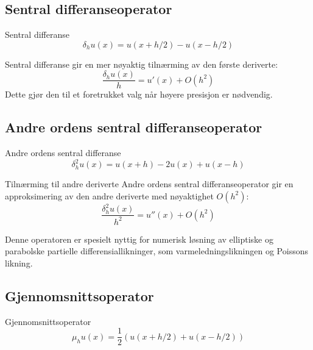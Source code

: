 \subsection{Sentral differanseoperator}
\begin{definition}{Sentral differanse}{}
	\begin{equation}
		\delta_h u(x) = u(x + h/2) - u(x - h/2) \label{eq:central_diff}
	\end{equation}
\end{definition}

\begin{remark*}{}{}
	Sentral differanse gir en mer nøyaktig tilnærming av den første deriverte:
	\begin{equation}
		\frac{\delta_h u(x)}{h} = u'(x) + O(h^2)
	\end{equation}
	Dette gjør den til et foretrukket valg når høyere presisjon er nødvendig.
\end{remark*}

\subsection{Andre ordens sentral differanseoperator}
\begin{definition}{Andre ordens sentral differanse}{}
	\begin{equation}
		\delta_h^2 u(x) = u(x + h) - 2u(x) + u(x - h) \label{eq:second_central_diff}
	\end{equation}
\end{definition}

\begin{proposition}{Tilnærming til andre deriverte}{}
	Andre ordens sentral differanseoperator gir en approksimering av den andre deriverte med nøyaktighet $O(h^2)$:
	\begin{equation}
		\frac{\delta_h^2 u(x)}{h^2} = u''(x) + O(h^2)
	\end{equation}
\end{proposition}

\begin{remark*}{}{}
	Denne operatoren er spesielt nyttig for numerisk løsning av elliptiske og parabolske partielle differensiallikninger, som varmeledningslikningen og Poissons likning.
\end{remark*}

\subsection{Gjennomsnittsoperator}
\begin{definition}{Gjennomsnittsoperator}{}
	\begin{equation}
		\mu_h u(x) = \frac{1}{2} \left( u(x + h/2) + u(x - h/2) \right) \label{eq:avg_op}
	\end{equation}
\end{definition}

